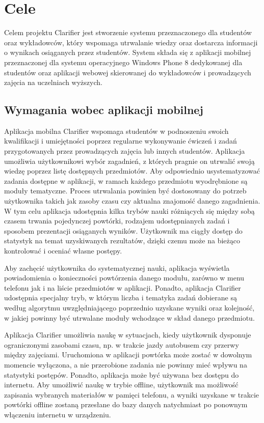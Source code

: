 \documentclass{pracamgr}
\begin{document}
\section{Cele}

Celem projektu Clarifier jest stworzenie systemu przeznaczonego dla studentów oraz wykładowców, który wspomaga utrwalanie wiedzy oraz dostarcza informacji o wynikach osiąganych przez studentów. System składa się z aplikacji mobilnej przeznaczonej dla systemu operacyjnego Windows Phone 8 dedykowanej dla studentów oraz aplikacji webowej skierowanej do wykładowców i prowadzących zajęcia na uczelniach wyższych.

\subsection{Wymagania wobec aplikacji mobilnej}
Aplikacja mobilna Clarifier wspomaga studentów w podnoszeniu swoich kwalifikacji i umiejętności poprzez regularne wykonywanie ćwiczeń i zadań przygotowanych przez prowadzących zajęcia lub innych studentów. Aplikacja umożliwia użytkownikowi wybór zagadnień, z których pragnie on utrwalić swoją wiedzę poprzez listę dostępnych przedmiotów. Aby odpowiednio usystematyzować zadania dostępne w aplikacji, w ramach każdego przedmiotu wyodrębnione są moduły tematyczne. Proces utrwalania powinien być dostosowany do potrzeb użytkownika takich jak zasoby czasu czy aktualna znajomość danego zagadnienia. W tym celu aplikacja udostępnia kilka trybów nauki różniących się między sobą czasem trwania pojedynczej powtórki, rodzajem udostępnianych zadań i sposobem prezentacji osiąganych wyników. Użytkownik ma ciągły dostęp do statystyk na temat uzyskiwanych rezultatów, dzięki czemu może na bieżąco kontrolować i oceniać własne postępy. 

Aby zachęcić użytkownika do systematycznej nauki, aplikacja wyświetla powiadomienia o konieczności powtórzenia danego modułu, zarówno w menu telefonu jak i na liście przedmiotów w aplikacji. Ponadto, aplikacja Clarifier udostępnia specjalny tryb, w którym liczba i tematyka zadań dobierane są według algorytmu uwzględniającego poprzednio uzyskane wyniki oraz kolejność, w jakiej powinny być utrwalane moduły wchodzące w skład danego przedmiotu.  

Aplikacja Clarifier umożliwia naukę w sytuacjach, kiedy użytkownik dysponuje ograniczonymi zasobami czasu, np. w trakcie jazdy autobusem czy przerwy między zajęciami. Uruchomiona w aplikacji powtórka może zostać w dowolnym momencie wyłączona, a nie przerobione zadania nie powinny mieć wpływu na statystyki postępów. Ponadto, aplikacja może być używana bez dostępu do internetu. Aby umożliwić naukę w trybie offline, użytkownik ma możliwość zapisania wybranych materiałów w pamięci telefonu, a wyniki uzyskane w trakcie powtórki offline zostaną przesłane do bazy danych natychmiast po ponownym włączeniu internetu w urządzeniu.
\end{document}
